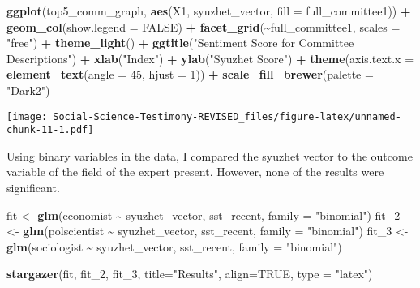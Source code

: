 \documentclass[]{article}
\newenvironment{Shaded}{\begin{snugshade}}{\end{snugshade}}
\newcommand{\DataTypeTok}[1]{\textcolor[rgb]{0.13,0.29,0.53}{#1}}
\newcommand{\DecValTok}[1]{\textcolor[rgb]{0.00,0.00,0.81}{#1}}
\newcommand{\KeywordTok}[1]{\textcolor[rgb]{0.13,0.29,0.53}{\textbf{#1}}}
\newcommand{\NormalTok}[1]{#1}
\newcommand{\OperatorTok}[1]{\textcolor[rgb]{0.81,0.36,0.00}{\textbf{#1}}}
\newcommand{\OtherTok}[1]{\textcolor[rgb]{0.56,0.35,0.01}{#1}}
\newcommand{\StringTok}[1]{\textcolor[rgb]{0.31,0.60,0.02}{#1}}
\begin{document}
\begin{Shaded}
\begin{Highlighting}[]
\KeywordTok{ggplot}\NormalTok{(top5\_comm\_graph, }\KeywordTok{aes}\NormalTok{(X1, syuzhet\_vector, }\DataTypeTok{fill =}\NormalTok{ full\_committee1)) }\OperatorTok{+}
\StringTok{  }\KeywordTok{geom\_col}\NormalTok{(}\DataTypeTok{show.legend =} \OtherTok{FALSE}\NormalTok{) }\OperatorTok{+}
\StringTok{  }\KeywordTok{facet\_grid}\NormalTok{(}\OperatorTok{\textasciitilde{}}\NormalTok{full\_committee1, }\DataTypeTok{scales =} \StringTok{"free"}\NormalTok{) }\OperatorTok{+}\StringTok{  }
\StringTok{  }\KeywordTok{theme\_light}\NormalTok{() }\OperatorTok{+}\StringTok{ }
\StringTok{  }\KeywordTok{ggtitle}\NormalTok{(}\StringTok{"Sentiment Score for Committee Descriptions"}\NormalTok{) }\OperatorTok{+}\StringTok{ }
\StringTok{  }\KeywordTok{xlab}\NormalTok{(}\StringTok{"Index"}\NormalTok{) }\OperatorTok{+}\StringTok{ }
\StringTok{  }\KeywordTok{ylab}\NormalTok{(}\StringTok{"Syuzhet Score"}\NormalTok{) }\OperatorTok{+}\StringTok{ }
\StringTok{  }\KeywordTok{theme}\NormalTok{(}\DataTypeTok{axis.text.x =} \KeywordTok{element\_text}\NormalTok{(}\DataTypeTok{angle =} \DecValTok{45}\NormalTok{, }\DataTypeTok{hjust =} \DecValTok{1}\NormalTok{)) }\OperatorTok{+}
\StringTok{  }\KeywordTok{scale\_fill\_brewer}\NormalTok{(}\DataTypeTok{palette =} \StringTok{"Dark2"}\NormalTok{) }
\end{Highlighting}
\end{Shaded}

\texttt{[image: Social-Science-Testimony-REVISED\_files/figure-latex/unnamed-chunk-11-1.pdf]}

Using binary variables in the data, I compared the syuzhet vector to the
outcome variable of the field of the expert present. However, none of
the results were significant.

\begin{Shaded}
\begin{Highlighting}[]
\NormalTok{fit \textless{}{-}}\StringTok{ }\KeywordTok{glm}\NormalTok{(economist }\OperatorTok{\textasciitilde{}}\StringTok{ }\NormalTok{syuzhet\_vector, sst\_recent, }\DataTypeTok{family =} \StringTok{"binomial"}\NormalTok{)}
\NormalTok{fit\_}\DecValTok{2}\NormalTok{ \textless{}{-}}\StringTok{ }\KeywordTok{glm}\NormalTok{(polscientist }\OperatorTok{\textasciitilde{}}\StringTok{ }\NormalTok{syuzhet\_vector, sst\_recent, }\DataTypeTok{family =} \StringTok{"binomial"}\NormalTok{)}
\NormalTok{fit\_}\DecValTok{3}\NormalTok{ \textless{}{-}}\StringTok{ }\KeywordTok{glm}\NormalTok{(sociologist }\OperatorTok{\textasciitilde{}}\StringTok{ }\NormalTok{syuzhet\_vector, sst\_recent, }\DataTypeTok{family =} \StringTok{"binomial"}\NormalTok{)}

\KeywordTok{stargazer}\NormalTok{(fit, fit\_}\DecValTok{2}\NormalTok{, fit\_}\DecValTok{3}\NormalTok{, }\DataTypeTok{title=}\StringTok{"Results"}\NormalTok{, }\DataTypeTok{align=}\OtherTok{TRUE}\NormalTok{, }\DataTypeTok{type =} \StringTok{"latex"}\NormalTok{)}
\end{Highlighting}
\end{Shaded}
\end{document}

